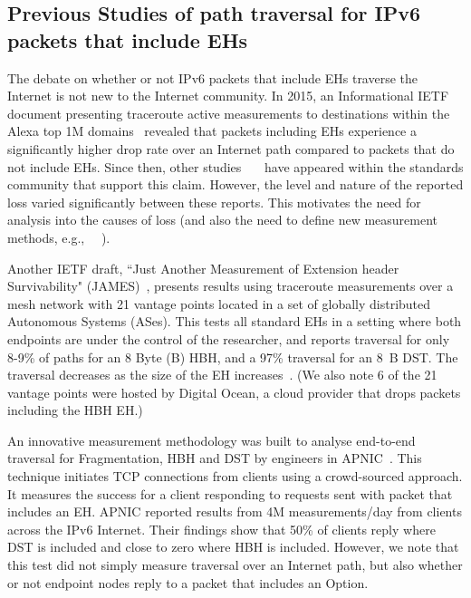 \documentclass[conference]{IEEEtran}
\begin{document}
\subsection{Previous Studies of path traversal for IPv6 packets that include EHs}

\label{sec:motivation}

The debate on whether or not IPv6 packets that include EHs traverse the Internet is not new to the Internet community.
In 2015, an Informational IETF document presenting traceroute active
measurements to destinations within the Alexa top 1M domains~\cite{RFC7872}
revealed that packets including EHs experience a significantly higher drop rate over an
Internet path compared to packets that do not include EHs. Since then, other
studies~\cite{james}~\cite{nalini-iepg114}~\cite{apnic} have appeared within the standards community that support this claim.  However,
the level and nature of the reported loss varied significantly between these
reports. This motivates the need for analysis into the causes of loss (and also the need to define new measurement methods, e.g., ~\cite{james}~\cite{elkins-v6ops-eh-deepdive-fw-01}).  

Another IETF draft, ``Just Another Measurement of Extension header
Survivability" (JAMES)~\cite{james}, presents results using
traceroute measurements over a mesh network with 21 vantage points located in a set of globally distributed Autonomous Systems (ASes). This tests all standard EHs
in a setting where both endpoints are under the control of the researcher, and reports traversal for only 8-9\% of paths for an 8 Byte (B) HBH, and a 97\% traversal for an 8~B DST. The traversal decreases as the size of the EH
increases~\cite{james-imc}. (We also note 6 of the 21 vantage points were
hosted by Digital Ocean\texttrademark, a cloud provider that drops packets including the HBH EH.)

An innovative measurement methodology was built to analyse end-to-end  traversal
for Fragmentation, HBH and DST by engineers in APNIC~\cite{apnic}.  This technique initiates TCP connections from clients using a crowd-sourced approach. It  measures the success for a client responding to requests sent with packet that includes an EH.  
APNIC reported results from 4M measurements/day from clients across the IPv6 Internet.  Their findings show that 50\%  of clients reply where DST is included and close to zero where HBH is included.
However, we note that this test did not simply measure traversal over an Internet path, but also whether or not endpoint nodes reply to a packet that includes an Option. 
\end{document}
